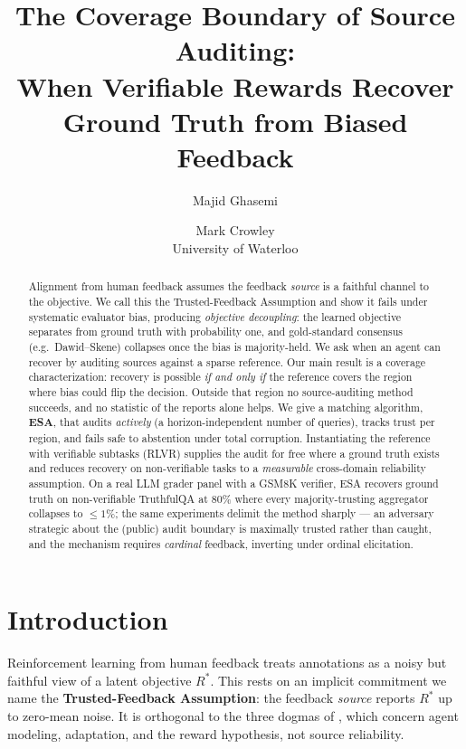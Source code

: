 \documentclass[11pt]{article}
\title{\bf The Coverage Boundary of Source Auditing:\\ When Verifiable Rewards Recover Ground Truth from Biased Feedback}
\author{Majid Ghasemi \and Mark Crowley\\ University of Waterloo}
\date{}
\theoremstyle{definition}\newtheorem{definition}{Definition}
\theoremstyle{definition}\newtheorem{assumption}{Assumption}
\newcommand{\Rstar}{R^{\ast}}\newcommand{\astar}{a^{\ast}}
\begin{document}
\maketitle

\begin{abstract}
\noindent
Alignment from human feedback assumes the feedback \emph{source} is a faithful channel to the
objective. We call this the Trusted-Feedback Assumption and show it fails under systematic evaluator
bias, producing \emph{objective decoupling}: the learned objective separates from ground truth with
probability one, and gold-standard consensus (e.g.\ Dawid--Skene) collapses once the bias is
majority-held. We ask when an agent can recover by auditing sources against a sparse reference. Our
main result is a coverage characterization: recovery is possible \emph{if and only if} the reference
covers the region where bias could flip the decision. Outside that region no source-auditing method
succeeds, and no statistic of the reports alone helps. We give a matching algorithm, \textbf{ESA},
that audits \emph{actively} (a horizon-independent number of queries), tracks trust per region, and
fails safe to abstention under total corruption. Instantiating the reference with verifiable
subtasks (RLVR) supplies the audit for free where a ground truth exists and reduces recovery on
non-verifiable tasks to a \emph{measurable} cross-domain reliability assumption. On a real LLM grader
panel with a GSM8K verifier, ESA recovers ground truth on non-verifiable TruthfulQA at $80\%$ where
every majority-trusting aggregator collapses to $\le 1\%$; the same experiments delimit the method
sharply --- an adversary strategic about the (public) audit boundary is maximally trusted rather than
caught, and the mechanism requires \emph{cardinal} feedback, inverting under ordinal elicitation.
\end{abstract}

\section{Introduction}
Reinforcement learning from human feedback treats annotations as a noisy but faithful view of a
latent objective $\Rstar$. This rests on an implicit commitment we name the \textbf{Trusted-Feedback
Assumption}: the feedback \emph{source} reports $\Rstar$ up to zero-mean noise. It is orthogonal to
the three dogmas of \citet{abel2024three}, which concern agent modeling, adaptation, and the reward
hypothesis, not source reliability.
\end{document}
